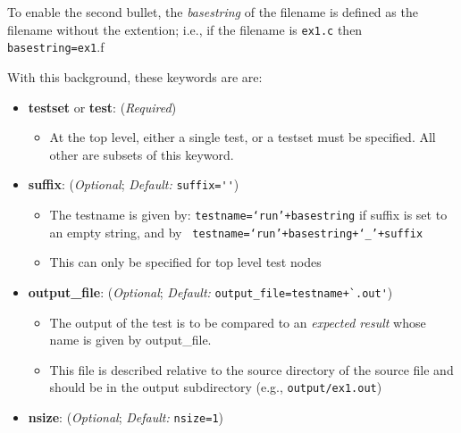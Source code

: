To enable the second bullet, the \emph{basestring} of the filename is defined
as the filename without the extention; i.e., if the filename is \lstinline{ex1.c}
then \lstinline{basestring=ex1}.f

\noindent
With this background, these keywords are are:

\begin{itemize}

  \item[] \textbf{testset} or \textbf{test}: (\emph{Required})

    \begin{itemize}

      \item[] At the top level, either a single test, or a testset must
            be specified.   All other are subsets of this keyword.

    \end{itemize}

  \item[]  \textbf{suffix}: (\emph{Optional}; \emph{Default:} \lstinline{suffix=''})
    \begin{itemize}

      \item The testname is given by: \texttt{testname=`run'+basestring} if suffix is set to an empty string, and by \texttt{ testname=`run'+basestring+`\_'+suffix}


      \item This can only be specified for top level test nodes

     \end{itemize}


   \item[]  \textbf{output\_file}: (\emph{Optional}; \emph{Default:} 
                 \lstinline{output_file=testname+`.out'})
      \begin{itemize}

      \item The output of the test is to be compared to an \emph{expected result}
      whose name is given by output\_file.

      \item This file is described relative to the source directory of the
      source file and should be in the output subdirectory (e.g.,
      \lstinline{output/ex1.out})

      \end{itemize}


    \item[]  \textbf{nsize}: (\emph{Optional}; \emph{Default:} \lstinline{nsize=1})
      \begin{itemize}


\end{itemize}
\end{itemize}
